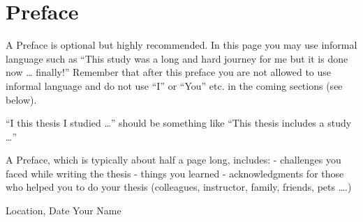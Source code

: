 
\pagestyle{empty}
\chapter*{Preface}

A Preface is optional but highly recommended. In this page you may use informal language
such as “This study was a long and hard journey for me but it is done now … finally!”
Remember that after this preface you are not allowed to use informal language and do not use “I” or “You” etc.
in the coming sections (see below).

“I this thesis I studied …” should be something like “This thesis includes a study …”

A Preface, which is typically about half a page long, includes:
-	challenges you faced while writing the thesis
-	things you learned
-	acknowledgments for those who helped you to do your thesis (colleagues, instructor, family, friends, pets ….)

Location, Date
Your Name


\clearpage

